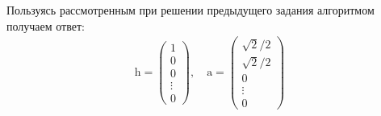 \documentclass[class=article,crop=false]{standalone}
\begin{document}
    \noindent Пользуясь рассмотренным при решении предыдущего задания алгоритмом получаем ответ:
    \begin{gather*}
        \mathrm{h}=
        \begin{pmatrix}
            1      \\
            0      \\
            0      \\
            \vdots \\
            0
        \end{pmatrix},\quad
        \mathrm{a}=
        \begin{pmatrix}
            \sqrt{2}/2 \\
            \sqrt{2}/2 \\
            0          \\
            \vdots     \\
            0
        \end{pmatrix}
    \end{gather*}
\end{document}
